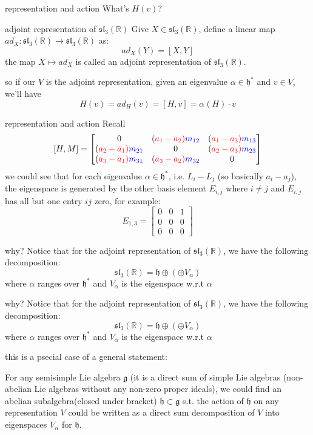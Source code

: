 \documentclass{beamer}
\newcommand{\R}{\mathbb{R}}
\begin{document}
\begin{frame}{representation and action}
	What's $H(v)$?
	
	\begin{defn}{adjoint representation of $\mathfrak{sl}_3(\R)$}{}
		Give $X \in \mathfrak{sl}_3(\R)$, define a linear map $ad_X : \mathfrak{sl}_3(\R) \to \mathfrak{sl}_3(\R)$ as: \[
			ad_X(Y) = [X,Y]
		\] the map $X \mapsto ad_X$ is called an adjoint representation of $\mathfrak{sl}_3(\R)$.
	\end{defn}
	so if our $V$ is the adjoint representation, given an eigenvalue  $\alpha \in \mathfrak{h}^*$ and $v \in V$, we'll have \[
		H(v) = ad_H(v) = [H, v] = \alpha(H) \cdot v
	\] 
\end{frame}

\begin{frame}{representation and action}
	Recall 
	\[ [H,M] = \def\a{\color{red}a} \def\m{\color{blue}m} \begin{bmatrix} 0& (\a_1-\a_2)\m_{12} & (\a_1-\a_3)\m_{13} \\ (\a_2-\a_1)\m_{21} & 0& (\a_2-\a_3)\m_{23} \\ (\a_3-\a_1)\m_{31} & (\a_3-\a_2)\m_{32} & 0 \end{bmatrix} \]
	we could see that for each eigenvalue $\alpha \in \mathfrak{h}^*$, i.e. $L_i - L_j$ (so basically $a_i-a_j$), the eigenspace is generated by the other basis element  $E_{i,j}$ where $i \neq j$ and $E_{i,j}$ has all but one entry $ij$ zero, for example:  \[
		E_{1,3} = \begin{bmatrix} 0 & 0 & 1 \\ 0 & 0 &0 \\ 0 &0 &0 \end{bmatrix} 
	\] 
\end{frame}

\begin{frame}{why?}
	Notice that for the adjoint representation of $\mathfrak{sl}_3(\R)$, we have the following decomposition:  \[
		\mathfrak{sl}_3(\R) = \mathfrak{h} \oplus \left( \oplus V_\alpha \right) 
	\] where $\alpha$ ranges over $\mathfrak{h}^*$ and $V_{\alpha}$ is the eigenspace w.r.t $\alpha$
\end{frame}

\begin{frame}{why?}
	Notice that for the adjoint representation of $\mathfrak{sl}_3(\R)$, we have the following decomposition:  \[
		\mathfrak{sl}_3(\R) = \mathfrak{h} \oplus \left( \oplus V_\alpha \right) 
	\] where $\alpha$ ranges over $\mathfrak{h}^*$ and $V_{\alpha}$ is the eigenspace w.r.t $\alpha$

	this is a psecial case of a general statement:
	\begin{theom}{}{}
		For any semisimple Lie algebra $\mathfrak{g}$ (it is a direct sum of simple Lie algebras (non-abelian Lie algebras without any non-zero proper ideals), we could find an abelian subalgebra(closed under bracket)  $\mathfrak{h} \subset \mathfrak{g}$ s.t. the action of $\mathfrak{h}$ on any representation $V$ could be written as a direct sum decomposition of $V$ into eigenspaces  $V_{\alpha}$ for $\mathfrak{h}$.
	\end{theom}
\end{frame}
\end{document}
